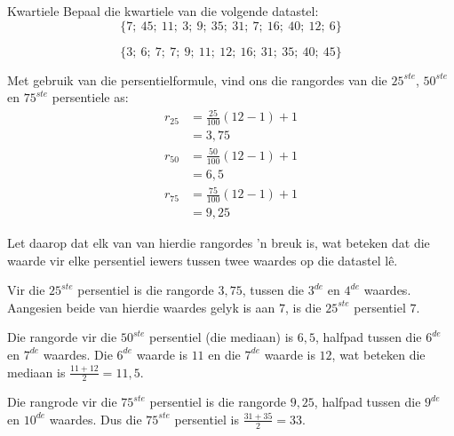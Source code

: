 
\begin{wex}{Kwartiele}
{Bepaal die kwartiele van die volgende datastel:
    \begin{equation*}
      \{7;\ 45;\ 11;\ 3;\ 9;\ 35;\ 31;\ 7;\ 16;\ 40;\ 12;\ 6\}
    \end{equation*}
}{
    \begin{equation*}
      \{3;\ 6;\ 7;\ 7;\ 9;\ 11;\ 12;\ 16;\ 31;\ 35;\ 40;\ 45\}
    \end{equation*}


    Met gebruik van die persentielformule, vind ons die rangordes van die $25^{ste}$,
    $50^{ste}$ en $75^{ste}$ persentiele as:
    \begin{align*}
      r_{25} &= \frac{25}{100}\left(12-1\right)+1 \\
            &= 3,75 \\
      r_{50} &= \frac{50}{100}\left(12-1\right)+1 \\
            &= 6,5 \\
      r_{75} &= \frac{75}{100}\left(12-1\right)+1 \\
            &= 9,25
    \end{align*}


    Let daarop dat elk van van hierdie rangordes ’n breuk is, wat beteken dat die waarde vir elke persentiel iewers tussen twee waardes op die datastel lê. \par

    Vir die $25^{ste}$ persentiel is die rangorde $3,75$, tussen die $3^{de}$ en $4^{de}$ waardes. Aangesien beide van hierdie waardes gelyk is aan 
    $7$, is die $25^{ste}$ persentiel $7$.\par

    Die rangorde vir die $50^{ste}$ persentiel (die mediaan) is $6,5$, halfpad tussen die  $6^{de}$ en $7^{de}$ waardes. Die $6^{de}$ waarde is
    $11$ en die $7^{de}$ waarde is $12$, wat beteken die mediaan is
    \(\frac{11+12}{2} = 11,5\).\par

    Die rangrode vir die $75^{ste}$ persentiel is die rangorde $9,25$, halfpad tussen die
    $9^{de}$ en $10^{de}$ waardes. Dus die $75^{ste}$ persentiel is
    \(\frac{31+35}{2} = 33\).\par
  }
\end{wex}
